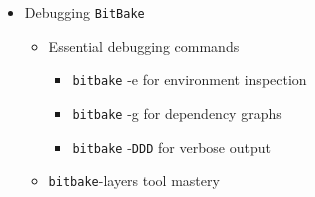 \documentclass[
]{article}
\providecommand{\tightlist}{%
  \setlength{\itemsep}{0pt}\setlength{\parskip}{0pt}}
\begin{document}
\begin{itemize}
\begin{itemize}
    \begin{itemize}
    \tightlist
    \item
      Override syntax and conditional metadata

      \begin{itemize}
      \tightlist
      \item
        Machine-specific overrides
      \item
        Distribution overrides
      \item
        Runtime vs build-time conditionals
      \end{itemize}
    \item
      Event handling system

      \begin{itemize}
      \tightlist
      \item
        Event types and handlers
      \item
        Custom event implementation
      \end{itemize}
    \item
      Shared state cache (sstate)

      \begin{itemize}
      \tightlist
      \item
        Cache mechanism internals
      \item
        Hash generation and validation
      \item
        Cache sharing strategies
      \end{itemize}
    \item
      Fetcher system

      \begin{itemize}
      \tightlist
      \item
        Supported protocols (\texttt{git}, \texttt{http}, \texttt{svn},
        etc.)
      \item
        Mirror configuration
      \item
        Shallow clones and bandwidth optimization
      \end{itemize}
    \end{itemize}
  \item
    Debugging \texttt{BitBake}

    \begin{itemize}
    \tightlist
    \item
      Essential debugging commands

      \begin{itemize}
      \tightlist
      \item
        \texttt{bitbake} -e for environment inspection
      \item
        \texttt{bitbake} -g for dependency graphs
      \item
        \texttt{bitbake} -\texttt{DDD} for verbose output
      \end{itemize}
    \item
      \texttt{bitbake}-layers tool mastery


\end{itemize}
\end{itemize}
\end{itemize}
\end{document}
